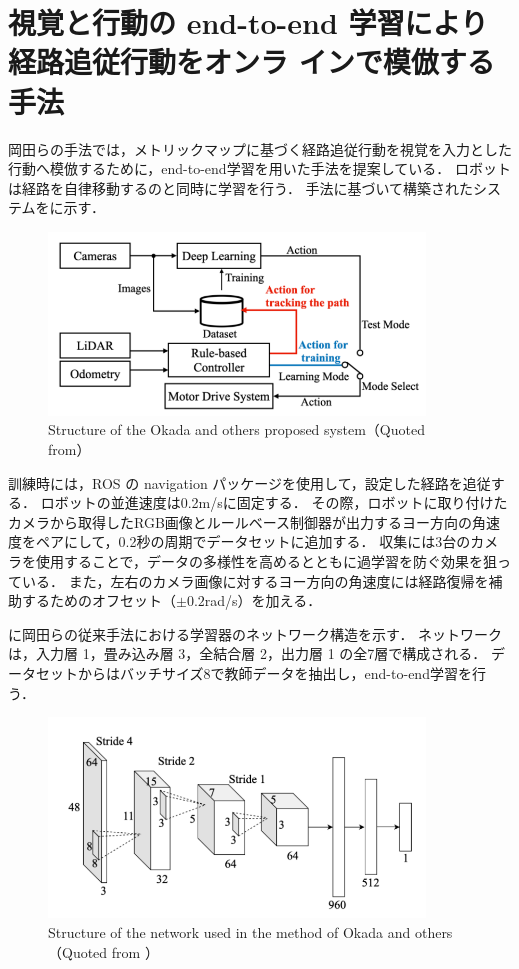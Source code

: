 \section{視覚と行動の end-to-end 学習により経路追従行動をオンラ
インで模倣する手法}
岡田らの手法では，メトリックマップに基づく経路追従行動を視覚を入力とした行動へ模倣するために，end-to-end学習を用いた手法を提案している．
ロボットは経路を自律移動するのと同時に学習を行う．
手法に基づいて構築されたシステムをに示す．

\begin{figure}[htbp]
  \centering
   \includegraphics[width=100mm]{images/pdf/okada/method_sys.pdf}
   \caption[Structure of the Okada and others proposed system]{Structure of the Okada and others proposed system（Quoted from\cite{okada2020}）}
   \label{fig:okada_sys}
\end{figure}
訓練時には，ROS の navigation パッケージを使用して，設定した経路を追従する．
ロボットの並進速度は0.2m/sに固定する．
その際，ロボットに取り付けたカメラから取得したRGB画像とルールベース制御器が出力するヨー方向の角速度をペアにして，0.2秒の周期でデータセットに追加する．
収集には3台のカメラを使用することで，データの多様性を高めるとともに過学習を防ぐ効果を狙っている．
また，左右のカメラ画像に対するヨー方向の角速度には経路復帰を補助するためのオフセット（\(\pm 0.2\)rad/s）を加える．

に岡田らの従来手法における学習器のネットワーク構造を示す．
ネットワークは，入力層 1，畳み込み層 3，全結合層 2，出力層 1 の全7層で構成される．
データセットからはバッチサイズ8で教師データを抽出し，end-to-end学習を行う．

\begin{figure}[htbp]
    \centering
     \includegraphics[width=100mm]{images/pdf/okada/network.pdf}
     \caption[Structure of the network used in the method of Okada and others]{Structure of the network used in the method of Okada and others（Quoted from \cite{okada2020}）}
     \label{fig:okada_net}
\end{figure}

